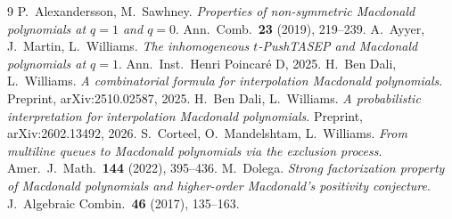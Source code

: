 \begin{thebibliography}{9}
 P.~Alexandersson, M.~Sawhney.
  \emph{Properties of non-symmetric Macdonald polynomials at $q=1$ and $q=0$}.
  Ann.\ Comb.\ \textbf{23} (2019), 219--239.
 A.~Ayyer, J.~Martin, L.~Williams.
  \emph{The inhomogeneous $t$-PushTASEP and Macdonald polynomials at $q=1$}.
  Ann.\ Inst.\ Henri Poincar\'e D, 2025.
 H.~Ben Dali, L.~Williams.
  \emph{A combinatorial formula for interpolation Macdonald polynomials}.
  Preprint, arXiv:2510.02587, 2025.
 H.~Ben Dali, L.~Williams.
  \emph{A probabilistic interpretation for interpolation Macdonald polynomials}.
  Preprint, arXiv:2602.13492, 2026.
 S.~Corteel, O.~Mandelshtam, L.~Williams.
  \emph{From multiline queues to Macdonald polynomials via the exclusion process}.
  Amer.\ J.\ Math.\ \textbf{144} (2022), 395--436.
 M.~Dolega.
  \emph{Strong factorization property of Macdonald polynomials and higher-order
  Macdonald's positivity conjecture}.
  J.\ Algebraic Combin.\ \textbf{46} (2017), 135--163.
\end{thebibliography}

\endgroup
